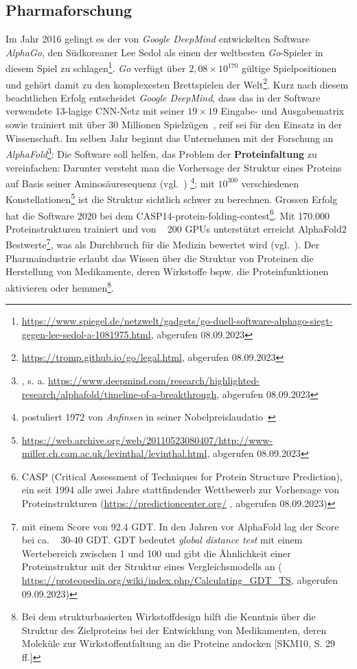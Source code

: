 \subsection{Pharmaforschung}
Im Jahr 2016 gelingt es der von \textit{Google DeepMind} entwickelten Software \textit{AlphaGo}, den Südkoreaner Lee Sedol als einen der weltbesten \textit{Go}-Spieler in diesem Spiel zu schlagen\footnote{
    \url{https://www.spiegel.de/netzwelt/gadgets/go-duell-software-alphago-siegt-gegen-lee-sedol-a-1081975.html}, abgerufen 08.09.2023
}. \textit{Go} verfügt über $2,08 \times 10^{170}$ gültige Spielpositionen und gehört damit zu den komplexesten Brettspielen der Welt\footnote{
    \url{https://tromp.github.io/go/legal.html}, abgerufen 08.09.2023
}. Kurz nach diesem beachtlichen Erfolg entscheidet \textit{Google DeepMind}, dass das in der Software verwendete 13-lagige CNN-Netz mit seiner $19 \times 19$ Eingabe- und Ausgabematrix sowie trainiert mit über 30 Millionen Spielzügen~\cite[371]{Ert21c}, reif sei für den Einsatz in der Wissenschaft. Im selben Jahr beginnt das Unternehmen mit der Forschung an \textit{AlphaFold}\footnote{
    \cite{JEP+21}, s. a. \url{https://www.deepmind.com/research/highlighted-research/alphafold/timeline-of-a-breakthrough}, abgerufen 08.09.2023
}: Die Software soll helfen, das Problem der \textbf{Proteinfaltung} zu vereinfachen: Darunter versteht man die Vorhersage der Struktur eines Proteins auf Basis seiner Aminosäuresequenz (vgl.~\cite{DOSW08}) \footnote{
    postuliert 1972 von \textit{Anfinsen} in seiner Nobelpreislaudatio~\cite[223]{Anf73}
}; mit $10^{300}$ verschiedenen Konstellationen\footnote{
    \url{https://web.archive.org/web/20110523080407/http://www-miller.ch.cam.ac.uk/levinthal/levinthal.html}, abgerufen 08.09.2023
} ist die Struktur sichtlich schwer zu berechnen.
Grossen Erfolg hat die Software 2020 bei dem CASP14-protein-folding-contest\footnote{
    CASP (Critical Assessment of Techniques for Protein Structure Prediction), ein seit 1994 alle zwei Jahre stattfindender Wettbewerb zur Vorhersage von Proteinstrukturen (\url{https://predictioncenter.org/} , abgerufen 08.09.2023)
}. Mit 170.000 Proteinstrukturen trainiert und von ~ 200 GPUs unterstützt erreicht AlphaFold2 Bestwerte\footnote{
    mit einem Score von 92.4 GDT. In den Jahren vor AlphaFold lag der Score bei ca. ~ 30-40 GDT. GDT bedeutet \textit{global distance test} mit einem Wertebereich zwischen 1 und 100 und gibt die Ähnlichkeit einer Proteinstruktur mit der Struktur eines Vergleichsmodells an (
    \url{https://proteopedia.org/wiki/index.php/Calculating_GDT_TS}, abgerufen 09.09.2023)
}, was als Durchbruch für die Medizin bewertet wird (vgl.~\cite[204]{Cal20}). Der Pharmaindustrie erlaubt das Wissen über die Struktur von Proteinen die Herstellung von Medikamente, deren Wirkstoffe bspw. die Proteinfunktionen aktivieren oder hemmen\footnote{
    Bei dem strukturbasierten Wirkstoffdesign hilft die Kenntnis über die Struktur des Zielproteins bei der Entwicklung von Medikamenten, deren Moleküle zur Wirkstoffentfaltung an die Proteine andocken [SKM10, S. 29 ff.]
}.


